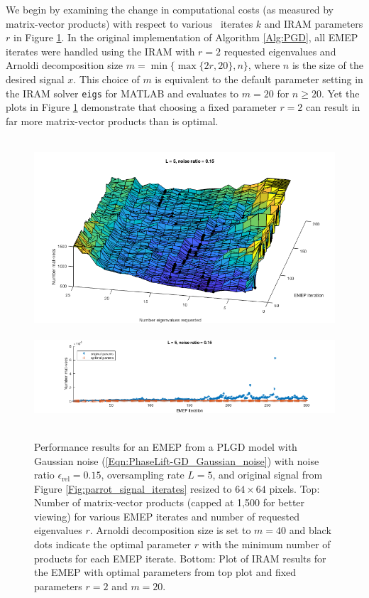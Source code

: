 We begin by examining the change in computational costs  (as measured by matrix-vector products) with respect to various \emep \ iterates $k$ and IRAM parameters $r$ in Figure \ref{Fig:Numerics-num_matvecs_orig_vs_optimal_params}.
In the original implementation of Algorithm \ref{Alg:PGD}, all EMEP iterates were handled using the IRAM with $r=2$ requested eigenvalues and Arnoldi decomposition size $m = \min \{  \max \{ 2r, 20 \}, n \}$, where $n$ is the size of the desired signal $x$.  
This choice of $m$ is equivalent to the default parameter setting in the IRAM solver \texttt{eigs} for MATLAB and evaluates to $m=20$ for $n \geq 20$.
Yet the plots in Figure \ref{Fig:Numerics-num_matvecs_orig_vs_optimal_params} demonstrate that choosing a fixed parameter $r=2$ can result in far more matrix-vector products than is optimal.


\begin{figure}[H]
\centering
\hbox{\hspace{-0.8cm} \includegraphics[scale=0.6]{Numerics-num_matvecs_orig_vs_optimal_params_1} }\vspace{1.0cm}
\hbox{\hspace{-1.6cm} \includegraphics[scale=0.6]{Numerics-num_matvecs_orig_vs_optimal_params_2} }\vspace{0.0cm}
	\caption{
Performance results for an EMEP from a PLGD model with Gaussian noise	(\ref{Eqn:PhaseLift-GD_Gaussian_noise}) with noise ratio $\epsilon_\text{rel} = 0.15$, oversampling rate $L = 5$, and original signal from Figure \ref{Fig:parrot_signal_iterates} resized to $64 \times 64$ pixels.
Top: Number of matrix-vector products (capped at 1,500 for better viewing) for various EMEP iterates and number of requested eigenvalues $r$.  
Arnoldi decomposition size is set to $m = 40$ and black dots indicate the optimal parameter $r$ with the minimum number of products for each EMEP iterate.
Bottom: Plot of IRAM results for the EMEP with optimal parameters from top plot and fixed parameters $r=2$ and $m=20$.
	}
\label{Fig:Numerics-num_matvecs_orig_vs_optimal_params}
\end{figure}




